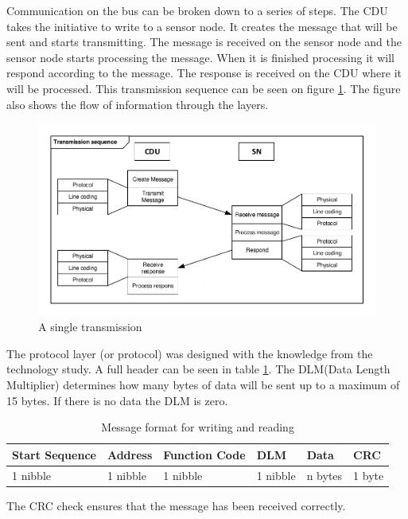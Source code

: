 Communication on the bus can be broken down to a series of steps. The CDU takes the initiative to write to a sensor node. It creates the message that will be sent and starts transmitting. The message is received on the sensor node and the sensor node starts processing the message. When it is finished processing it will respond according to the message. The response is received on the CDU where it will be processed. This transmission sequence can be seen on figure \ref{fig:sintrans}. The figure also shows the flow of information through the layers. 
\begin{figure}[hbpt]
\centering
\includegraphics[width=.8\textwidth]{billeder/11ProjectDescription/singletransmission}
\caption{A single transmission}
\label{fig:sintrans}
\end{figure}

The protocol layer (or protocol) was designed with the knowledge from the technology study. A full header can be seen in table \ref{table:stdmsgtosensor}. The DLM(Data Length Multiplier) determines how many bytes of data will be sent up to a maximum of 15 bytes. If there is no data the DLM is zero.
\begin{table}[hbpt]
\centering
\begin{tabular}{|l|l|l|l|l|l|}
	\hline
	Start Sequence & Address & Function Code & DLM & Data & CRC  \\ \hline
	1 nibble & 1 nibble	& 1 nibble & 1 nibble & n bytes & 1 byte\\
	\hline
\end{tabular}
\caption{Message format for writing and reading}
\label{table:stdmsgtosensor}
\end{table}
The CRC check ensures that the message has been received correctly.

